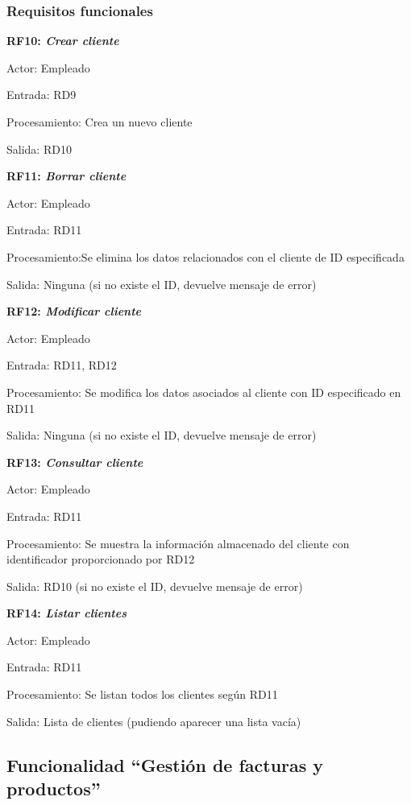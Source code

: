 \documentclass[paper=a4, fontsize=11pt, spanish]{scrartcl}
\begin{document}
\subsubsection{Requisitos funcionales}
\setlength{\parindent}{0em}
\textbf{RF10: \textit{Crear cliente}}
\setlength{\parindent}{2em}

Actor: Empleado

Entrada: RD9

Procesamiento: Crea un nuevo cliente

Salida: RD10

\setlength{\parindent}{0em}
\textbf{RF11: \textit{Borrar cliente}}
\setlength{\parindent}{2em}

Actor: Empleado

Entrada: RD11

Procesamiento:Se elimina los datos relacionados con el cliente de ID especificada

Salida: Ninguna (si no existe el ID, devuelve mensaje de error)

\setlength{\parindent}{0em}
\textbf{RF12: \textit{Modificar cliente}}
\setlength{\parindent}{2em}

Actor: Empleado

Entrada: RD11, RD12

Procesamiento: Se modifica los datos asociados al cliente con ID especificado en RD11

Salida: Ninguna (si no existe el ID, devuelve mensaje de error)

\setlength{\parindent}{0em}
\textbf{RF13: \textit{Consultar cliente}}
\setlength{\parindent}{2em}

Actor: Empleado

Entrada: RD11

Procesamiento: Se muestra la información almacenado del cliente con identificador proporcionado por RD12

Salida:  RD10 (si no existe el ID, devuelve mensaje de error)

\setlength{\parindent}{0em}
\textbf{RF14: \textit{Listar clientes}}
\setlength{\parindent}{2em}

Actor: Empleado

Entrada: RD11

Procesamiento: Se listan todos los clientes según RD11

Salida: Lista de clientes (pudiendo aparecer una lista vacía)

\subsection{Funcionalidad “Gestión de facturas y productos”}
\end{document}
